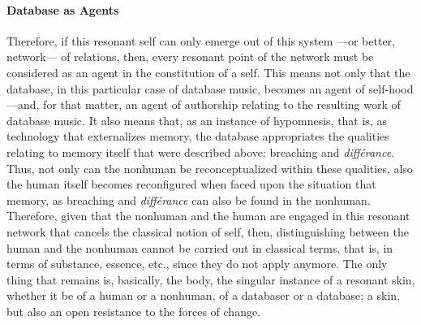 \paragraph{Database as Agents}
Therefore, if this resonant self can only emerge out of this system ---or better, network--- of relations, then, every resonant point of the network must be considered as an agent in the constitution of a self. This means not only that the database, in this particular case of database music, becomes an agent of self-hood ---and, for that matter, an agent of authorship relating to the resulting work of database music. It also means that, as an instance of hypomnesis, that is, as technology that externalizes memory, the database appropriates the qualities relating to memory itself that were described above: breaching and \textit{différance}. Thus, not only can the nonhuman be reconceptualized within these qualities, also the human itself becomes reconfigured when faced upon the situation that memory, as breaching and \textit{différance} can also be found in the nonhuman. Therefore, given that the nonhuman and the human are engaged in this resonant network that cancels the classical notion of self, then, distinguishing between the human and the nonhuman cannot be carried out in classical terms, that is, in terms of substance, essence, etc., since they do not apply anymore. The only thing that remains is, basically, the body, the singular instance of a resonant skin, whether it be of a human or a nonhuman, of a databaser or a database; a skin, but also an open resistance to the forces of change.
